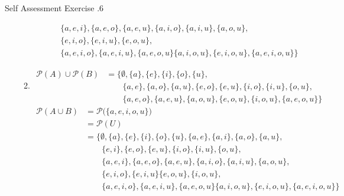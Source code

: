 \documentclass[../notes.tex]{subfiles}
\begin{document}
\begin{exercise}{Self Assessment Exercise \thechapter.6}
\begin{enumerate}
\begin{enumerate}[label=(\alph*)]
\begin{align*}
									& \qquad \{a, e, i\}, \{a, e, o\}, \{a, e, u\}, \{a, i, o\}, \{a, i, u\}, \{a, o, u\}, \\
									& \qquad \{e, i, o\}, \{e, i, u\},  \{e, o, u\}, \\
									& \qquad \{a, e, i, o\}, \{a, e, i, u\}, \{a, e, o, u\} \{a, i, o, u\}, \{e, i, o, u\}, \{a, e, i, o, u\}\bigr\}
								\end{align*}
							\item \moveup
								\begin{align*}
									\mathcal{P}(A) \cup \mathcal{P}(B) &= \bigl\{\emptyset, \{a\}, \{e\}, \{i\}, \{o\}, \{u\},\\
									& \qquad \{a, e\}, \{a, o\}, \{a, u\}, \{e, o\}, \{e, u\}, \{i, o\}, \{i, u\}, \{o, u\}, \\
									& \qquad \{a, e, o\}, \{a, e, u\}, \{a, o, u\}, \{e, o, u\}, \{i, o, u\}, \{a, e, o, u\}\bigr\}
								\end{align*}
								\begin{align*}
									\mathcal{P}(A \cup B) &= \mathcal{P}\bigl(\{a, e, i, o, u\}\bigr)\\
									&= \mathcal{P}(U)\\
									&= \bigl\{\emptyset, \{a\}, \{e\}, \{i\}, \{o\}, \{u\}, \{a, e\}, \{a, i\}, \{a, o\}, \{a, u\},\\
									& \qquad \{e, i\}, \{e, o\}, \{e, u\}, \{i, o\}, \{i, u\}, \{o, u\},\\
									& \qquad \{a, e, i\}, \{a, e, o\}, \{a, e, u\}, \{a, i, o\}, \{a, i, u\}, \{a, o, u\},\\
									& \qquad \{e, i, o\}, \{e, i, u\} \{e, o, u\}, \{i, o, u\},\\
									& \qquad \{a, e, i, o\}, \{a, e, i, u\}, \{a, e, o, u\} \{a, i, o, u\}, \{e, i, o, u\}, \{a, e, i, o, u\}\bigr\}
								\end{align*}
						\end{enumerate}
				\end{enumerate}
			\end{exercise}
\end{document}
